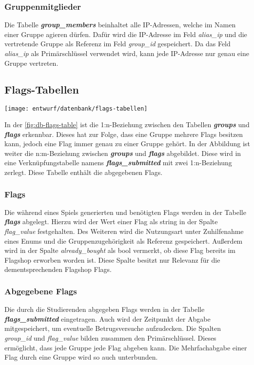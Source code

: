\subsubsection{Gruppenmitglieder}
Die Tabelle \textbf{\textit{group\_members}} beinhaltet alle IP-Adressen, welche im Namen einer Gruppe agieren dürfen. Dafür wird die IP-Adresse im Feld \textit{alias\_ip} und die vertretende Gruppe als Referenz im Feld \textit{group\_id} gespeichert. Da das Feld \textit{alias\_ip} als Primärschlüssel verwendet wird, kann jede IP-Adresse nur genau eine Gruppe vertreten.

\subsection{Flags-Tabellen}
\begin{center}
	\texttt{[image: entwurf/datenbank/flags-tabellen]}
	\label{fig:db-flags-table}
\end{center}


In der \autoref{fig:db-flags-table} ist die 1:n-Beziehung zwischen den Tabellen \textbf{\textit{groups}} und \textbf{\textit{flags}} erkennbar. Dieses hat zur Folge, dass eine Gruppe mehrere Flags besitzen kann, jedoch eine Flag immer genau zu einer Gruppe gehört. In der Abbildung ist weiter die n:m-Beziehung zwischen \textbf{\textit{groups}} und \textbf{\textit{flags}} abgebildet. Diese wird in eine Verknüpfungstabelle namens \textbf{\textit{flags\_submitted}} mit zwei 1:n-Beziehung zerlegt. Diese Tabelle enthält die abgegebenen Flags.
 
\subsubsection{Flags}
Die während eines Spiels generierten und benötigten Flags werden in der Tabelle \textbf{\textit{flags}} abgelegt. Hierzu wird der Wert einer Flag als string in der Spalte \textit{flag\_value} festgehalten. Des Weiteren wird die Nutzungsart unter Zuhilfenahme eines Enums und die Gruppenzugehörigkeit als Referenz gespeichert. Außerdem wird in der Spalte \textit{already\_bought} als bool vermerkt, ob diese Flag bereits im Flagshop erworben worden ist. Diese Spalte besitzt nur Relevanz für die dementsprechenden Flagshop Flags.

\subsubsection{Abgegebene Flags}
Die durch die Studierenden abgegeben Flags werden in der Tabelle \textbf{\textit{flags\_submitted}} eingetragen. Auch wird der Zeitpunkt der Abgabe mitgespeichert, um eventuelle Betrugsversuche aufzudecken. Die Spalten \textit{group\_id} und \textit{flag\_value} bilden zusammen den Primärschlüssel. Dieses ermöglicht, dass jede Gruppe jede Flag abgeben kann. Die Mehrfachabgabe einer Flag durch eine Gruppe wird so auch unterbunden.

